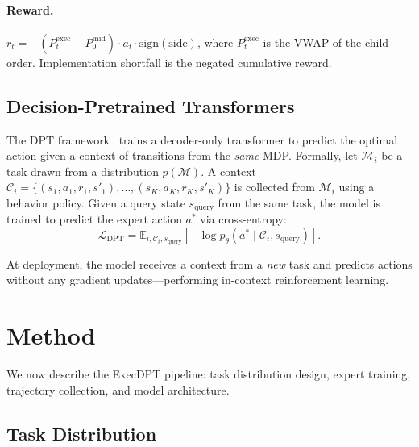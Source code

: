 \documentclass[sigconf,review,anonymous]{acmart}
\newcommand{\E}{\mathbb{E}}
\newcommand{\calM}{\mathcal{M}}
\newcommand{\calC}{\mathcal{C}}
\newcommand{\calL}{\mathcal{L}}
\begin{document}
\paragraph{Reward.}
$r_t = -(P^{\text{exec}}_t - P^{\text{mid}}_0) \cdot a_t \cdot \text{sign}(\text{side})$, where $P^{\text{exec}}_t$ is the VWAP of the child order.
Implementation shortfall is the negated cumulative reward.

\subsection{Decision-Pretrained Transformers}

The DPT framework~\cite{lee2023supervised} trains a decoder-only transformer to predict the optimal action given a context of transitions from the \emph{same} MDP.
Formally, let $\calM_i$ be a task drawn from a distribution $p(\calM)$.
A context $\calC_i = \{(s_1, a_1, r_1, s'_1), \ldots, (s_K, a_K, r_K, s'_K)\}$ is collected from $\calM_i$ using a behavior policy.
Given a query state $s_{\text{query}}$ from the same task, the model is trained to predict the expert action $a^*$ via cross-entropy:
\begin{equation}\label{eq:dpt-loss}
    \calL_{\text{DPT}} = \E_{i, \calC_i, s_{\text{query}}}\left[-\log p_\theta(a^* \mid \calC_i, s_{\text{query}})\right].
\end{equation}

At deployment, the model receives a context from a \emph{new} task and predicts actions without any gradient updates---performing in-context reinforcement learning.


\section{Method}\label{sec:method}

We now describe the ExecDPT pipeline: task distribution design, expert training, trajectory collection, and model architecture.

\subsection{Task Distribution}\label{sec:tasks}
\end{document}
